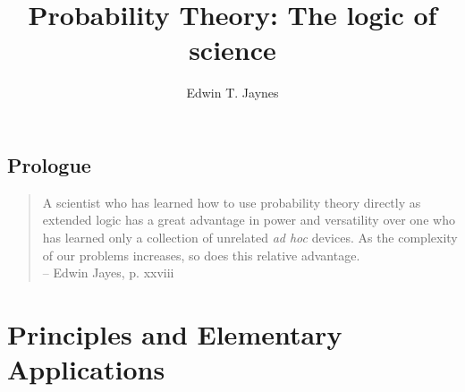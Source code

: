 \documentclass[krantz1]{krantz}
\begin{document}
\frontmatter

\title{Probability Theory: The logic of science}
\author{Edwin T. Jaynes}

\maketitle

%
\setcounter{page}{7} %
\tableofcontents
%
%
%
%

\mainmatter

\chapter*{Prologue}

\begin{quotation}
    A scientist who has learned how to use probability theory directly as extended logic
    has a great advantage in power and versatility over one who has learned only a
    collection of unrelated \emph{ad hoc} devices. As the complexity of our problems
    increases, so does this relative advantage.\\
    \hfill -- Edwin Jayes, p. xxviii
\end{quotation}

\part{Principles and Elementary Applications}

%







\printindex
\end{document}
